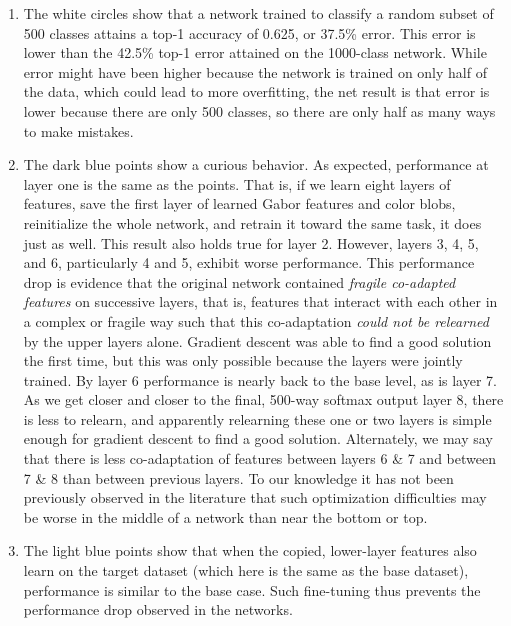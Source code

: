 \begin{enumerate}[leftmargin=1.5em]

\item The white  circles show that a network trained to classify a random subset of 500 classes attains a top-1 accuracy of 0.625, or 37.5\% error. This error is lower than the 42.5\% top-1 error attained on the 1000-class network. While error might have been higher because the network is trained on only half of the data, which could lead to more overfitting, the net result is that error is lower because there are only 500 classes, so there are only half as many ways to make mistakes. 

\item The dark blue  points show a curious behavior. As expected, performance at layer one is the same as the  points. That is, 
if we learn eight layers of features, save the first layer of learned Gabor features and color blobs, reinitialize the whole network, and retrain it toward the same task, it does just as well. This result also holds true for layer 2. However, layers 3, 4, 5, and 6, particularly 4 and 5, exhibit
worse performance.
This performance drop  is evidence that the original network contained \emph{fragile co-adapted features} on successive layers, that is, features that interact with each other in a complex or fragile way such that this co-adaptation \emph{could not be relearned} by the upper layers alone. Gradient descent was able to find a good solution the first time, but this was only possible because the layers were jointly trained. By layer 6 performance is nearly back to the base level, as is layer 7. As we get closer and closer to the final, 500-way softmax output layer 8, there is less to relearn, and apparently relearning these one or two layers is simple enough for gradient descent to find a good solution. Alternately, we may say that there is less co-adaptation of features between layers 6 \& 7 and between 7 \& 8 than between previous layers. To our knowledge it has not been previously observed in the literature that such optimization difficulties may be worse in the middle of a network than near the bottom or top.

\item The light blue  points show that when the copied, lower-layer features also learn on the target dataset (which here is the same as the base dataset), performance is similar to the base case. Such fine-tuning thus prevents the performance drop observed in the  networks.


\end{enumerate}
